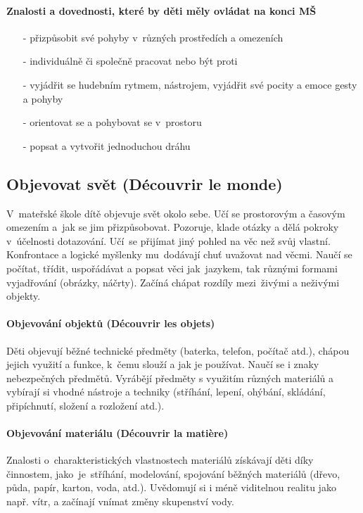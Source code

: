 				\paragraph{Znalosti a dovednosti, které by děti měly ovládat na konci MŠ}

				\begin{itemize}
					\setlength\itemsep{-2mm}
					\item[-] přizpůsobit své pohyby v různých prostředích a omezeních
					\item[-] individuálně či společně pracovat nebo být proti
					\item[-] vyjádřit se hudebním rytmem, nástrojem, vyjádřit své pocity a emoce gesty a pohyby
					\item[-] orientovat se a pohybovat se v prostoru
					\item[-] popsat a vytvořit jednoduchou dráhu
				\end{itemize}

		\subsection{Objevovat svět (Découvrir le monde)}
			V mateřské škole dítě objevuje svět okolo sebe. Učí se prostorovým a časovým omezením a jak se jim přizpůsobovat. Pozoruje, klade otázky a dělá pokroky v účelnosti dotazování. Učí se přijímat jiný pohled na věc než svůj vlastní.  Konfrontace a logické myšlenky mu dodávají chuť uvažovat nad věcmi. Naučí se počítat, třídit, uspořádávat a popsat věci jak jazykem, tak různými formami vyjadřování (obrázky, náčrty). Začíná chápat rozdíly mezi živými a neživými objekty.

			\paragraph{Objevování objektů (Découvrir les objets)}
				Děti objevují běžné technické předměty (baterka, telefon, počítač atd.), chápou jejich využití a funkce, k čemu slouží a jak je používat. Naučí se i znaky nebezpečných předmětů.
				Vyrábějí předměty s využitím různých materiálů a vybírají si vhodné nástroje a techniky (stříhání, lepení, ohýbání, skládání, připíchnutí, složení a rozložení atd.).
			\paragraph{Objevování materiálu (Découvrir la matière)}
				Znalosti o~charakteristických vlastnostech materiálů získávají děti díky činnostem, jako je stříhání, modelování, spojování běžných materiálů (dřevo, půda, papír, karton, voda, atd.).
				Uvědomují si i méně viditelnou realitu jako např. vítr, a začínají vnímat změny skupenství vody. 
